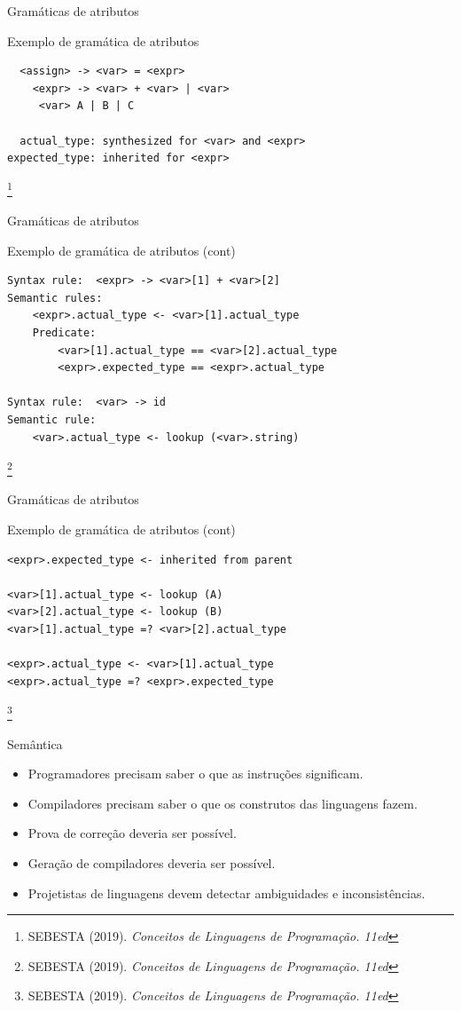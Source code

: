 \documentclass[handout, aspectratio=169]{beamer}
\begin{document}
\begin{frame}[fragile]{Gramáticas de atributos}
	\begin{block}{Exemplo de gramática de atributos}\footnotesize
		\begin{verbatim}
  <assign> -> <var> = <expr>
    <expr> -> <var> + <var> | <var>
     <var> A | B | C

  actual_type: synthesized for <var> and <expr>
expected_type: inherited for <expr>
\end{verbatim}\footnote{SEBESTA (2019). \textit{Conceitos de Linguagens de Programação. 11ed}}
	\end{block}
\end{frame}


\begin{frame}[fragile]{Gramáticas de atributos}
	\begin{block}{Exemplo de gramática de atributos (cont)}\footnotesize
		\begin{verbatim}
Syntax rule:  <expr> -> <var>[1] + <var>[2]
Semantic rules:
	<expr>.actual_type <- <var>[1].actual_type
	Predicate:
		<var>[1].actual_type == <var>[2].actual_type
		<expr>.expected_type == <expr>.actual_type

Syntax rule:  <var> -> id
Semantic rule:
	<var>.actual_type <- lookup (<var>.string)
		\end{verbatim}\footnote{SEBESTA (2019). \textit{Conceitos de Linguagens de Programação. 11ed}}
	\end{block}
\end{frame}

\begin{frame}[fragile]{Gramáticas de atributos}
	\begin{block}{Exemplo de gramática de atributos (cont)}\footnotesize
		\begin{verbatim}
<expr>.expected_type <- inherited from parent

<var>[1].actual_type <- lookup (A)
<var>[2].actual_type <- lookup (B)
<var>[1].actual_type =? <var>[2].actual_type

<expr>.actual_type <- <var>[1].actual_type
<expr>.actual_type =? <expr>.expected_type
		\end{verbatim}\footnote{SEBESTA (2019). \textit{Conceitos de Linguagens de Programação. 11ed}}
	\end{block}
\end{frame}

\begin{frame}{Semântica}
\begin{itemize}
	\item Programadores precisam saber o que as instruções significam.
	\item Compiladores precisam saber o que os construtos das linguagens fazem.
	\item Prova de correção deveria ser possível.
	\item Geração de compiladores deveria ser possível.
	\item Projetistas de linguagens devem detectar ambiguidades e inconsistências.
\end{itemize}
\end{frame}
\end{document}
